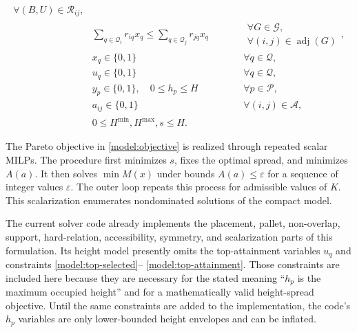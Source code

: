 \documentclass[11pt]{article}
\newcommand{\Pallet}{\mathcal{P}}
\newcommand{\Place}{\mathcal{Q}}
\begin{document}
\begin{subequations}
\begin{alignat}{3}
{                       \forall(B,U)\in\mathcal{R}_{ij}},
  \label{model:access-relations}\\
  & \sum_{q\in\Place_i}r_{iq}x_q
      \le \sum_{q\in\Place_j}r_{jq}x_q
  && \qquad \substack{\forall G\in\mathcal G,\\
                       \forall(i,j)\in\operatorname{adj}(G)},
  \label{model:identical-symmetry}\\[0.2em]
  & x_q\in\{0,1\}
  && \qquad \forall q\in\Place,
  \label{model:x-domain}\\
  & u_q\in\{0,1\}
  && \qquad \forall q\in\Place,
  \label{model:u-domain}\\
  & y_p\in\{0,1\},\quad 0\le h_p\le H
  && \qquad \forall p\in\Pallet,
  \label{model:yh-domain}\\
  & a_{ij}\in\{0,1\}
  && \qquad \forall(i,j)\in\mathcal{A},
  \label{model:a-domain}\\
  & 0\le H^{\min},H^{\max},s\le H.
  &&
  \label{model:height-domains}
\end{alignat}
\end{subequations}

The Pareto objective in \eqref{model:objective} is realized through repeated
scalar MILPs.  The procedure first minimizes
$s$, fixes the optimal spread, and minimizes $A(a)$.  It then solves
$\min M(x)$ under bounds $A(a)\le\varepsilon$ for a sequence of integer
values $\varepsilon$.  The outer loop repeats this process for admissible
values of $K$.  This scalarization enumerates nondominated solutions of the
compact model.

The current solver code already implements the placement, pallet, non-overlap,
support, hard-relation, accessibility, symmetry, and scalarization parts of
this formulation.  Its height model presently omits the top-attainment
variables $u_q$ and constraints \eqref{model:top-selected}--
\eqref{model:top-attainment}.  Those constraints are included here because
they are necessary for the stated meaning ``$h_p$ is the maximum occupied
height'' and for a mathematically valid height-spread objective.  Until the
same constraints are added to the implementation, the code's $h_p$ variables
are only lower-bounded height envelopes and can be inflated.
\end{document}
